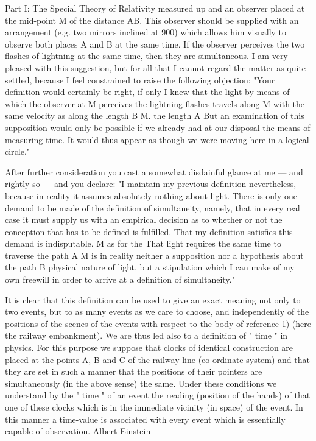 \documentclass{article}
\begin{document}
Part I: The Special Theory of Relativity
measured up and an observer placed at the mid-point M of the distance AB. This observer
should be supplied with an arrangement (e.g. two mirrors inclined at 900) which allows him
visually to observe both places A and B at the same time. If the observer perceives the two
flashes of lightning at the same time, then they are simultaneous.
I am very pleased with this suggestion, but for all that I cannot regard the matter as quite
settled, because I feel constrained to raise the following objection:
"Your definition would certainly be right, if only I knew that the light by
means of which the observer at M perceives the lightning flashes travels along
M with the same velocity as along the length B
M.
the length A
But an examination of this supposition would only be possible if we already
had at our disposal the means of measuring time. It would thus appear as
though we were moving here in a logical circle."

After further consideration you cast a somewhat disdainful glance at me — and rightly so
— and you declare:
"I maintain my previous definition nevertheless, because in reality it
assumes absolutely nothing about light. There is only one demand to be made
of the definition of simultaneity, namely, that in every real case it must supply
us with an empirical decision as to whether or not the conception that has to be
defined is fulfilled. That my definition satisfies this demand is indisputable.
M as for the
That light requires the same time to traverse the path A
M is in reality neither a supposition nor a hypothesis about the
path B
physical nature of light, but a stipulation which I can make of my own freewill
in order to arrive at a definition of simultaneity."

It is clear that this definition can be used to give an exact meaning not only to two events,
but to as many events as we care to choose, and independently of the positions of the scenes
of the events with respect to the body of reference 1) (here the railway embankment). We are
thus led also to a definition of " time " in physics. For this purpose we suppose that clocks
of identical construction are placed at the points A, B and C of the railway line (co-ordinate
system) and that they are set in such a manner that the positions of their pointers are
simultaneously (in the above sense) the same. Under these conditions we understand by the
" time " of an event the reading (position of the hands) of that one of these clocks which is
in the immediate vicinity (in space) of the event. In this manner a time-value is associated
with every event which is essentially capable of observation.
Albert Einstein
\end{document}
